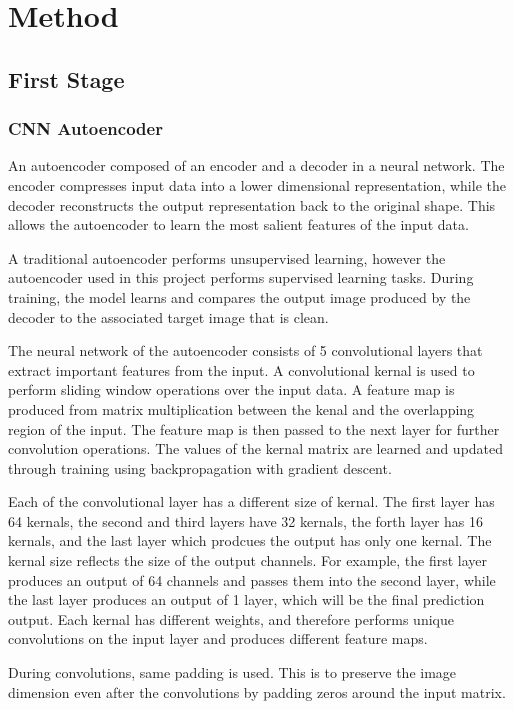 \documentclass[10pt,twocolumn,letterpaper]{article}
\begin{document}
\section{Method}
\subsection{First Stage}
\subsubsection{CNN Autoencoder}
    An autoencoder composed of an encoder and a decoder in a neural network. The encoder compresses input data into a lower dimensional representation, while the decoder reconstructs the output representation back to the original shape. This allows the autoencoder to learn the most salient features of the input data.

    A traditional autoencoder performs unsupervised learning, however the autoencoder used in this project performs supervised learning tasks. During training, the model learns and compares the output image produced by the decoder to the associated target image that is clean.

    The neural network of the autoencoder consists of 5 convolutional layers that extract important features from the input. A convolutional kernal is used to perform sliding window operations over the input data. A feature map is produced from matrix multiplication between the kenal and the overlapping region of the input. The feature map is then passed to the next layer for further convolution operations. The values of the kernal matrix are learned and updated through training using backpropagation with gradient descent.

    Each of the convolutional layer has a different size of kernal. The first layer has 64 kernals, the second and third layers have 32 kernals, the forth layer has 16 kernals, and the last layer which prodcues the output has only one kernal. The kernal size reflects the size of the output channels. For example, the first layer produces an output of 64 channels and passes them into the second layer, while the last layer produces an output of 1 layer, which will be the final prediction output. Each kernal has different weights, and therefore performs unique convolutions on the input layer and produces different feature maps. 

    During convolutions, same padding is used. This is to preserve the image dimension even after the convolutions by padding zeros around the input matrix. 
\end{document}
